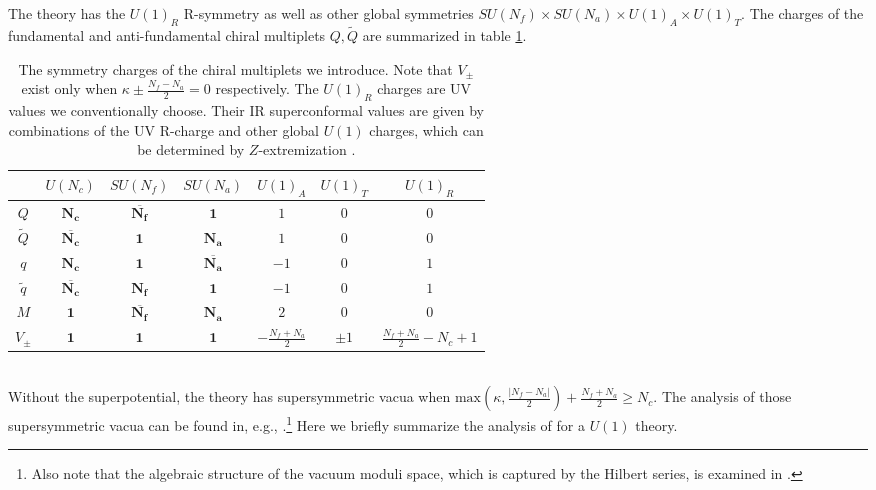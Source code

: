 \documentclass[a4paper,11pt]{article}
\begin{document}
The theory has the $U(1)_R$ R-symmetry as well as other global symmetries $SU(N_f) \times SU(N_a) \times U(1)_A  \times U(1)_T$. The charges of the fundamental and anti-fundamental chiral multiplets $Q, \tilde Q$ are summarized in table \ref{tab:AGK}.
%
\begin{table}[tbp]
\centering
\begin{tabular}{|c|cccccc|}
\hline
 & $U(N_c)$ & $SU(N_f)$ & $SU(N_a)$ & $U(1)_A$ & $U(1)_T$ & $U(1)_R$ \\
\hline
$Q$ & $\mathbf{N_c}$ & $\mathbf{\overline{N_f}}$ & $\mathbf 1$ & $1$ & $0$ & $0$ \\
$\tilde Q$ & $\mathbf{\overline{N_c}}$ & $\mathbf 1$ & $\mathbf{N_a}$ & $1$ & $0$ & $0$ \\
\hline
$q$ & $\mathbf{N_c}$ & $\mathbf 1$ & $\mathbf{\overline{N_a}}$ & $-1$ & $0$ & $1$ \\
$\tilde q$ & $\mathbf{\overline{N_c}}$ & $\mathbf{N_f}$ & $\mathbf 1$ & $-1$ & $0$ & $1$ \\
$M$ & $\mathbf 1$ & $\mathbf{\overline{N_f}}$ & $\mathbf{N_a}$ & $2$ & $0$ & $0$ \\
$V_\pm$ & $\mathbf 1$ & $\mathbf 1$ & $\mathbf 1$ & $-\frac{N_f+N_a}{2}$ & $\pm 1$ & $\frac{N_f+N_a}{2}-N_c+1$ \\
\hline
\end{tabular}
\caption{\label{tab:AGK} The symmetry charges of the chiral multiplets we introduce. Note that $V_\pm$ exist only when $\kappa \pm \frac{N_f-N_a}{2} = 0$ respectively. The $U(1)_R$ charges are UV values we conventionally choose. Their IR superconformal values are given by combinations of the UV R-charge and other global $U(1)$ charges, which can be determined by $Z$-extremization \cite{Jafferis:2010un}.}
\end{table}
%
\\


Without the superpotential, the theory has supersymmetric vacua when $\textrm{max}\left(\kappa,\frac{|N_f-N_a|}{2}\right)+\frac{N_f+N_a}{2} \geq N_c$. The analysis of those supersymmetric vacua can be found in, e.g., \cite{Aharony:1997bx,Giveon:2008zn,Intriligator:2013lca}.\footnote{Also note that the algebraic structure of the vacuum moduli space, which is captured by the Hilbert series, is examined in \cite{Hanany:2015via,Cremonesi:2015dja,Cremonesi:2016nbo}.} Here we briefly summarize the analysis of \cite{Intriligator:2013lca} for a $U(1)$ theory.
\end{document}

